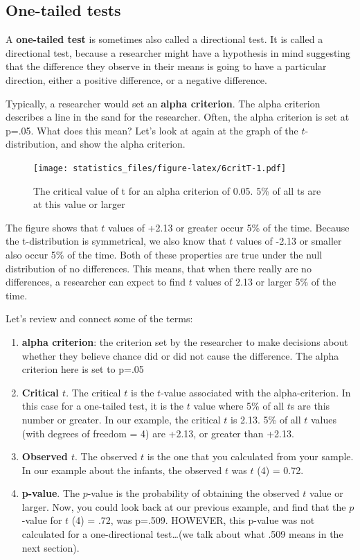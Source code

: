 \documentclass[]{book}
\begin{document}
\hypertarget{one-tailed-tests}{%
\subsection{One-tailed tests}\label{one-tailed-tests}}

A \textbf{one-tailed test} is sometimes also called a directional test. It is called a directional test, because a researcher might have a hypothesis in mind suggesting that the difference they observe in their means is going to have a particular direction, either a positive difference, or a negative difference.

Typically, a researcher would set an \textbf{alpha criterion}. The alpha criterion describes a line in the sand for the researcher. Often, the alpha criterion is set at p=.05. What does this mean? Let's look at again at the graph of the \(t\)-distribution, and show the alpha criterion.

\begin{figure}
\centering
\texttt{[image: statistics\_files/figure-latex/6critT-1.pdf]}
\caption{\label{fig:6critT}The critical value of t for an alpha criterion of 0.05. 5\% of all ts are at this value or larger}
\end{figure}

The figure shows that \(t\) values of +2.13 or greater occur 5\% of the time. Because the t-distribution is symmetrical, we also know that \(t\) values of -2.13 or smaller also occur 5\% of the time. Both of these properties are true under the null distribution of no differences. This means, that when there really are no differences, a researcher can expect to find \(t\) values of 2.13 or larger 5\% of the time.

Let's review and connect some of the terms:

\begin{enumerate}
\def\labelenumi{\arabic{enumi}.}
\item
  \textbf{alpha criterion}: the criterion set by the researcher to make decisions about whether they believe chance did or did not cause the difference. The alpha criterion here is set to p=.05
\item
  \textbf{Critical \(t\)}. The critical \(t\) is the \(t\)-value associated with the alpha-criterion. In this case for a one-tailed test, it is the \(t\) value where 5\% of all \(t\)s are this number or greater. In our example, the critical \(t\) is 2.13. 5\% of all \(t\) values (with degrees of freedom = 4) are +2.13, or greater than +2.13.
\item
  \textbf{Observed \(t\)}. The observed \(t\) is the one that you calculated from your sample. In our example about the infants, the observed \(t\) was \(t\) (4) = 0.72.
\item
  \textbf{p-value}. The \(p\)-value is the probability of obtaining the observed \(t\) value or larger. Now, you could look back at our previous example, and find that the \(p\)-value for \(t\) (4) = .72, was p=.509. HOWEVER, this p-value was not calculated for a one-directional test\ldots{}(we talk about what .509 means in the next section).
\end{enumerate}
\end{document}
